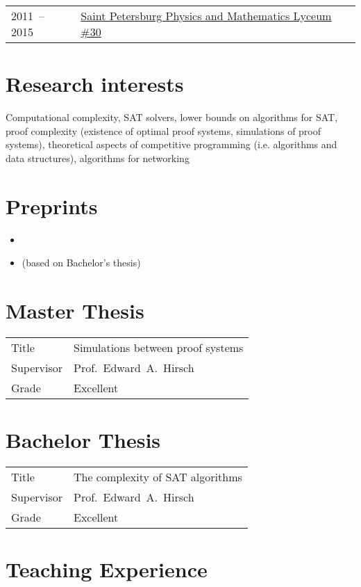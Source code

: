 \documentclass[a4paper, 11pt]{article}
\begin{document}
\begin{tabularx}{\textwidth}{lX}
	2011~-- 2015 & \href{http://www.school30.spb.ru/}{Saint Petersburg Physics and Mathematics Lyceum \#30}
\end{tabularx}


\section*{Research interests}

Computational complexity, SAT solvers, lower bounds on algorithms for SAT, proof complexity (existence of optimal proof systems, simulations of proof systems), theoretical aspects of competitive programming (i.e. algorithms and data structures), algorithms for networking

\section*{Preprints}

\begin{itemize}
	\item {}
	\item {} (based on Bachelor's thesis)
\end{itemize}

\section*{Master Thesis}

\begin{tabularx}{\textwidth}{lX}
	Title & Simulations between proof systems \\
	Supervisor & Prof.~Edward~A.~Hirsch \\
	Grade & Excellent
\end{tabularx}

\section*{Bachelor Thesis}

\begin{tabularx}{\textwidth}{lX}
	Title & The complexity of SAT algorithms \\
	Supervisor & Prof.~Edward~A.~Hirsch \\
	Grade & Excellent
\end{tabularx}

\section*{Teaching Experience}
\end{document}

